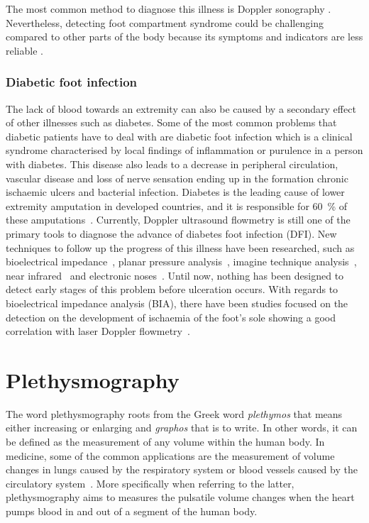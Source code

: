 The most common method to diagnose this illness is Doppler sonography \cite{chhabra2013compartment}. Nevertheless, detecting foot compartment syndrome could be challenging compared to other parts of the body because its symptoms and indicators are less reliable \cite{dodd2013foot}.

\subsubsection{Diabetic foot infection}
\label{section literature 2.3} 
The lack of blood towards an extremity can also be caused by a secondary effect of other illnesses such as diabetes. Some of the most common problems that diabetic patients have to deal with are diabetic foot infection which is a clinical syndrome characterised by local findings of inflammation or purulence in a person with diabetes. This disease also leads to a decrease in peripheral circulation, vascular disease and loss of nerve sensation ending up in the formation chronic ischaemic ulcers and bacterial infection. Diabetes is the leading cause of lower extremity amputation in developed countries, and it is responsible for \SI{60}{\percent} of these amputations~\cite{ucckay2014diabetic}.  Currently, Doppler ultrasound flowmetry is still one of the primary tools to diagnose the advance of diabetes foot infection (DFI). New techniques to follow up the progress of this illness have been researched, such as bioelectrical impedance~\cite{cheng2012application}, planar pressure analysis~\cite{dos2010insole}, imagine technique analysis~\cite{songer2001tissue}, near infrared~\cite{papazoglou2008assessment} and electronic noses~\cite{yusuf2013diagnosis}. Until now, nothing has been designed to detect early stages of this problem before ulceration occurs. With regards to bioelectrical impedance analysis (BIA), there have been studies focused on the detection on the development of ischaemia of the foot's sole showing a good correlation with laser Doppler flowmetry~\cite{cheng2012application}. 

\section{Plethysmography}
\label{section literature 3}
The word plethysmography roots from the Greek word \textit{plethymos} that means either increasing or enlarging and \textit{graphos} that is to write. In other words, it can be defined as the measurement of any volume within the human body. In medicine, some of the common applications are the measurement of volume changes in lungs caused by the respiratory system or blood vessels caused by the circulatory system~\cite{turcott2004methods}. More specifically when referring to the latter, plethysmography aims to measures the pulsatile volume changes when the heart pumps blood in and out of a segment of the human body. 

